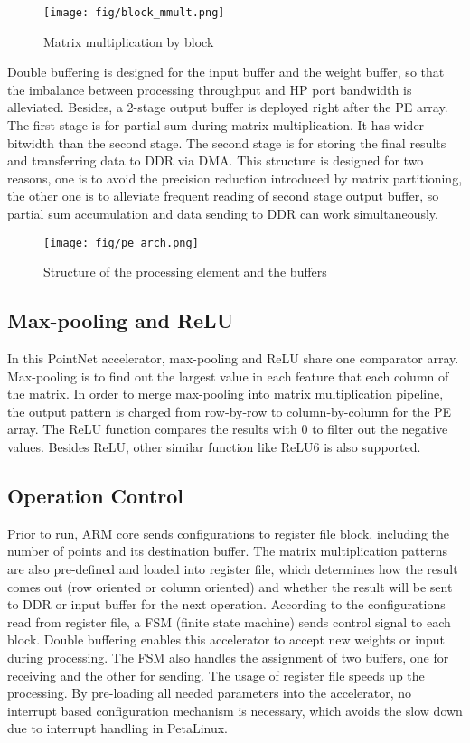 \documentclass[conference]{IEEEtran}
\begin{document}
\begin{figure}[htbp]
    \centering
    \texttt{[image: fig/block\_mmult.png]}
    \caption{Matrix multiplication by block}
    \label{fig:pe_arch}
\end{figure}

Double buffering is designed for the input buffer and the weight buffer, so that the imbalance between processing throughput and HP port bandwidth is alleviated. Besides, a 2-stage output buffer is deployed right after the PE array. The first stage is for partial sum during matrix multiplication. It has wider bitwidth than the second stage. The second stage is for storing the final results and transferring data to DDR via DMA. This structure is designed for two reasons, one is to avoid the precision reduction introduced by matrix partitioning, the other one is to alleviate frequent reading of second stage output buffer, so partial sum accumulation and data sending to DDR can work simultaneously.

\begin{figure}[htbp]
    \centering
    \texttt{[image: fig/pe\_arch.png]}
    \caption{Structure of the processing element and the buffers}
    \label{fig:block_mmult}
\end{figure}

\subsection{Max-pooling and ReLU}
In this PointNet accelerator, max-pooling and ReLU share one comparator array. Max-pooling is to find out the largest value in each feature that each column of the matrix. In order to merge max-pooling into matrix multiplication pipeline, the output pattern is charged from row-by-row to column-by-column for the PE array. The ReLU function compares the results with 0 to filter out the negative values. Besides ReLU, other similar function like ReLU6 is also supported.

\subsection{Operation Control}
Prior to run, ARM core sends configurations to register file block, including the number of points and its destination buffer. The matrix multiplication patterns are also pre-defined and loaded into register file, which determines how the result comes out (row oriented or column oriented) and whether the result will be sent to DDR or input buffer for the next operation. According to the configurations read from register file, a FSM (finite state machine) sends control signal to each block. Double buffering enables this accelerator to accept new weights or input during processing. The FSM also handles  the assignment of two buffers, one for receiving and the other for sending. The usage of register file speeds up the processing. By pre-loading all needed parameters into the accelerator, no interrupt based configuration mechanism is necessary, which avoids the slow down due to interrupt handling in PetaLinux. 
\end{document}
